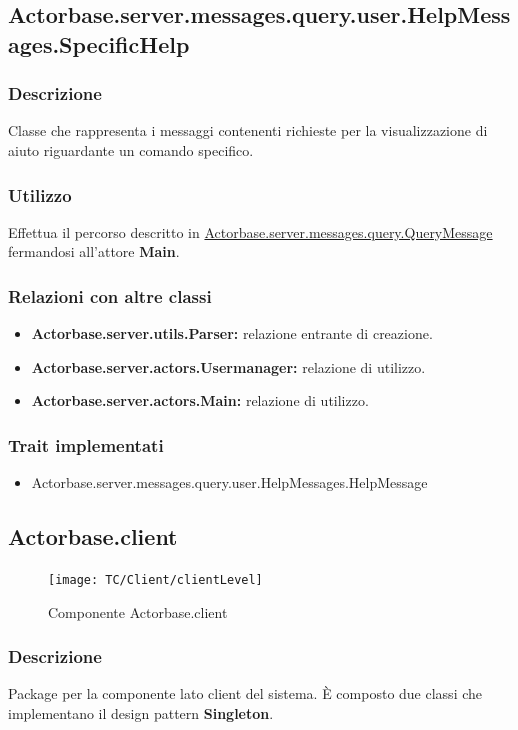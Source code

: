 \documentclass[a4paper]{article}
\begin{document}
		\subsection{Actorbase.server.messages.query.user.HelpMessages.SpecificHelp}
			\subsubsection{Descrizione}
				Classe che rappresenta i messaggi contenenti richieste per la visualizzazione di aiuto riguardante un comando specifico.
				
			\subsubsection{Utilizzo}
				Effettua il percorso descritto in \hyperref[QueryMessage]{Actorbase.server.messages.query.QueryMessage} fermandosi all'attore \textbf{Main}.
				
			\subsubsection{Relazioni con altre classi}
				\begin{itemize}
					\item \textbf{Actorbase.server.utils.Parser:} relazione entrante di creazione.
					\item \textbf{Actorbase.server.actors.Usermanager:} relazione di utilizzo.
					\item \textbf{Actorbase.server.actors.Main:} relazione di utilizzo.
				\end{itemize}
			\subsubsection{Trait implementati}
				\begin{itemize}
					\item Actorbase.server.messages.query.user.HelpMessages.HelpMessage
				\end{itemize}
			
		\subsection{Actorbase.client}
		
			\begin{figure}[H]
				\centering
				\texttt{[image: TC/Client/clientLevel]}
				\caption{Componente Actorbase.client}
			\end{figure}
			\subsubsection{Descrizione}
				Package per la componente lato client del sistema. 
				È composto due classi che implementano il design pattern \textbf{Singleton}.
				
\end{document}

